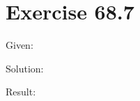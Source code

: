 \documentclass[a4paper, 10pt]{scrartcl}
\begin{document}
\section{Exercise 68.7}

Given:

Solution:

Result:
\end{document}
